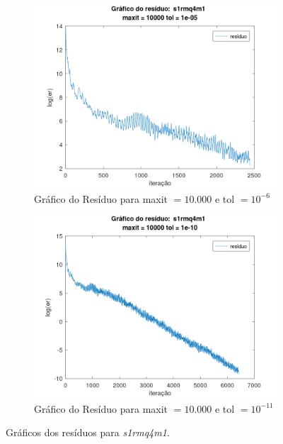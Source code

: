 \begin{figure}[H]
    \par\bigskip
    \begin{subfigure}[t]{0.4\linewidth}
         \centering
         \includegraphics[width=\textwidth]{image/s1rmq4m1_10000_-6.png}
         \caption{Gráfico do Resíduo para maxit $= 10.000$ e tol $=10^{-6}$}
         \label{fig:s1rmq4m1-10-6}
    \end{subfigure}
    \quad
    \begin{subfigure}[t]{0.4\linewidth}
         \centering
         \includegraphics[width=\textwidth]{image/s1rmq4m1_10000_-11.png}
         \caption{Gráfico do Resíduo para maxit $= 10.000$ e tol $=10^{-11}$}
         \label{fig:s1rmq4m1-10-11}
    \end{subfigure}
    \caption{Gráficos dos resíduos para \textit{s1rmq4m1}.}
    \label{fig:s1rmq4m1}
\end{figure}